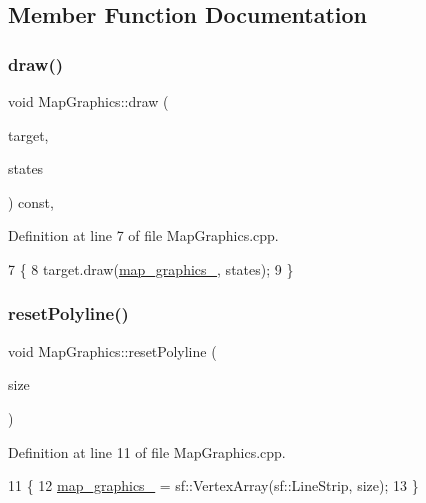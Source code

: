 \subsection{Member Function Documentation}
\mbox{\label{classMapGraphics_a6bd8a1174e0f56edb00def916a096e3c}} 
\subsubsection{\texorpdfstring{draw()}{draw()}}
{\footnotesize\ttfamily void Map\+Graphics\+::draw (\begin{DoxyParamCaption}\item[{sf\+::\+Render\+Target \&}]{target,  }\item[{sf\+::\+Render\+States}]{states }\end{DoxyParamCaption}) const\hspace{0.3cm}{\ttfamily [override]}, {\ttfamily [private]}}



Definition at line 7 of file Map\+Graphics.\+cpp.


\begin{DoxyCode}
7                                                                           \{
8     target.draw(\hyperlink{classMapGraphics_a2136d586176f0c3a008182ff3fba50e3}{map\_graphics\_}, states);
9 \}
\end{DoxyCode}
\mbox{\label{classMapGraphics_a389137596a79ed6a8239fe5451f8f470}} 
\subsubsection{\texorpdfstring{reset\+Polyline()}{resetPolyline()}}
{\footnotesize\ttfamily void Map\+Graphics\+::reset\+Polyline (\begin{DoxyParamCaption}\item[{size\+\_\+t}]{size }\end{DoxyParamCaption})}



Definition at line 11 of file Map\+Graphics.\+cpp.


\begin{DoxyCode}
11                                            \{
12     \hyperlink{classMapGraphics_a2136d586176f0c3a008182ff3fba50e3}{map\_graphics\_} = sf::VertexArray(sf::LineStrip, size);
13 \}
\end{DoxyCode}
\mbox{\label{classMapGraphics_a0d58d85db2e9d6e62623ebab6ffa11e9}} 
